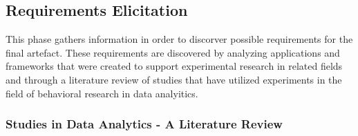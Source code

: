 
\subsection{Requirements Elicitation}

This phase gathers information in order to discorver possible requirements for the final artefact. These requirements are discovered by analyzing applications and frameworks that were created to support experimental research in related fields and through a literature review of studies that have utilized experiments in the field of behavioral research in data analyitics.

\subsubsection{Studies in Data Analytics - A Literature Review }\label{subsec:literature_review_requirements}

